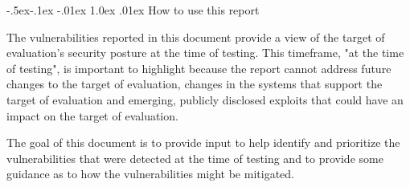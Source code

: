 \documentclass{article}
\makeatletter
\renewcommand{\subsection}{\@startsection{subsection}{2}{\z@}%
            {-.5ex\@plus -.1ex \@minus -.01ex}%
            {1.0ex \@plus .01ex}%
            {\normalfont\large\color{subsectioncolor}}}
\makeatother
\begin{document}
            \subsection{\large How to use this report}

            \large The vulnerabilities reported in this document provide a view of the target of evaluation's security posture
            at the time of testing. This timeframe, "at the time of testing", is important to highlight because the report
            cannot address future changes to the target of evaluation, changes in the systems that support the target of evaluation and emerging, publicly disclosed exploits that could have an impact on the target
            of evaluation.

            \noindent \large The goal of this document is to provide input to help identify and prioritize the vulnerabilities that were
            detected at the time of testing and to provide some guidance as to how the vulnerabilities might be
            mitigated.
            
\end{document}
